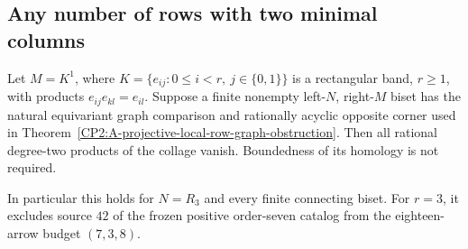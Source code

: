 \subsection{Any number of rows with two minimal columns}

\begin{theorem}
\label{CP2:A-two-column-band-graph-source}
Let $M=K^1$, where
$K=\{e_{ij}:0\le i<r,\ j\in\{0,1\}\}$ is a rectangular
band, $r\ge1$, with products $e_{ij}e_{kl}=e_{il}$.
Suppose a finite nonempty left-$N$, right-$M$ biset has
the natural equivariant graph comparison and rationally
acyclic opposite corner used in
Theorem~\ref{CP2:A-projective-local-row-graph-obstruction}.
Then all rational degree-two products of the collage vanish.
Boundedness of its homology is not required.

In particular this holds for $N=R_3$ and every finite
connecting biset.  For $r=3$, it excludes source $42$
of the frozen positive order-seven catalog from the
eighteen-arrow budget $(7,3,8)$.
\end{theorem}

